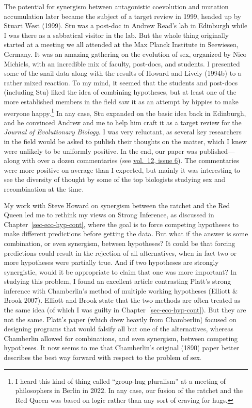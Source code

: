 \documentclass[
  letterpaper,
]{book}
\begin{document}
The potential for synergism between antagonistic coevolution and
mutation accumulation later became the subject of a target review in
1999, headed up by Stuart West (1999). Stu was a post-doc in Andrew
Read's lab in Edinburgh while I was there as a sabbatical visitor in the
lab. But the whole thing originally started at a meeting we all attended
at the Max Planck Institute in Seewiesen, Germany. It was an amazing
gathering on the evolution of sex, organized by Nico Michiels, with an
incredible mix of faculty, post-docs, and students. I presented some of
the snail data along with the results of Howard and Lively (1994b) to a
rather mixed reaction. To my mind, it seemed that the students and
post-docs (including Stu) liked the idea of combining hypotheses, but at
least one of the more established members in the field saw it as an
attempt by hippies to make everyone happy.\footnote{I heard this kind of
  thing called ``group-hug pluralism'' at a meeting of philosophers in
  Berlin in 2022. In any case, our fusion of the ratchet and the Red
  Queen was based on logic rather than any sort of craving for hugs.} In
any case, Stu expanded on the basic idea back in Edinburgh, and he
convinced Andrew and me to help him craft it as a target review for the
\emph{Journal of Evolutionary Biology}. I was very reluctant, as several
key researchers in the field would be asked to publish their thoughts on
the matter, which I knew were unlikely to be uniformly positive. In the
end, our paper was published---along with over a dozen commentaries (see
\href{https://onlinelibrary.wiley.com/toc/14209101/1999/12/6}{vol.~12,
issue 6}). The commentaries were more positive on average than I
expected, but mainly it was interesting to see the diversity of thought
by some of the top biologists studying sex and recombination at the
time.

My work with Steve Howard on synergism between the ratchet and the Red
Queen led me to rethink my views on Strong Inference, as discussed in
Chapter~\ref{sec-eco-hyp-cont}, where the goal is to force competing
hypotheses to make different predictions before getting the data. But
what if the answer is some combination, or even synergism, between
hypotheses? It could be that forcing predictions could result in the
rejection of all alternatives, when in fact two or more hypotheses were
partially true. And if two hypotheses are strongly synergistic, would it
be appropriate to claim that one was more important? In studying this
problem, I found an excellent article contrasting Platt's strong
inference with Chamberlin's method of multiple working hypotheses
(Elliott \& Brook 2007). Elliott and Brook state that the two methods
are often treated as the same idea (of which I was guilty in
Chapter~\ref{sec-eco-hyp-cont}). But they are not the same. Platt's
paper (which drew heavily from Chamberlin) focused on designing programs
that would falsify all but one of the alternatives, whereas Chamberlin
allowed for combinations, and even synergism, between competing
hypotheses. It now seems to me that Chamberlin's original (1890) paper
better describes the best way forward with respect to the problem of
sex.
\end{document}
